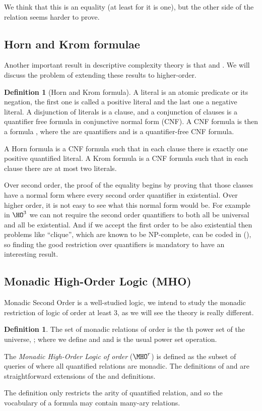 \documentclass[a4paper,12pt]{article}
\newcommand{\emphdex}[1]{\index{#1}\emph{#1}}
\theoremstyle{definition}
\newtheorem{definition}[theorem]{Definition}
\newcommand{\hoa}[1]{\ensuremath{\HO^{#1}}}
\newcommand{\mhoa}[1]{\ensuremath{\MHO^{#1}}}
\begin{document}
We think that this is an equality (at least for  it is one), but the
other side of the relation seems harder to prove.
\subsection{Horn and Krom formulae }\label{horn}
Another important result in descriptive complexity theory is that
 and . We will discuss the problem of
extending these results to higher-order.

\begin{definition}[Horn and Krom formula]A literal is an atomic predicate
  or its negation, the first one is called a positive literal and the last
  one a negative literal. A disjunction of literals is a clause, and a
  conjunction of clauses is a quantifier free formula in conjunctive
  normal form (CNF). A CNF formula is then a formula , where the  are
  quantifiers and  is a quantifier-free CNF formula.

  A Horn formula is a CNF formula such that in each clause there is
  exactly one positive quantified literal. A Krom formula is a CNF
  formula such that in each clause there are at most two literals.
\end{definition}

Over second order, the proof of the equality begins by proving that
those classes have a normal form where every second order quantifier
in existential. Over higher order, it is not easy to see what this
normal form would be. For example in \hoa{3} we can not require
the second order quantifiers to both all be universal and all be existential. And if we
accept the first order to be also existential then problems like
``clique'', which are known to be NP-complete, can be coded in
\SO(\HORN), so finding the good restriction over quantifiers is
mandatory to have an interesting result.


\subsection{Monadic High-Order Logic (MHO)}
\label{sec:mho}
Monadic Second Order  is a well-studied logic, we intend to
study the monadic restriction of logic of order at least 3, as we will
see the theory is really different.

\begin{definition}
The set of monadic relations of order  is the th
  power set of the universe, ; where we define  and  and  is
  the usual power set operation. 

  The \emphdex{Monadic High-Order Logic of order  } (\mhoa{r}) is
  defined as the subset of queries of  where all quantified
  relations are monadic. The definitions of 
  and  are straightforward extensions of the \HO{} and
   definitions.
\end{definition}
The definition only restricts the arity of quantified relation, and so
the vocabulary of a formula may contain many-ary relations.
\end{document}
